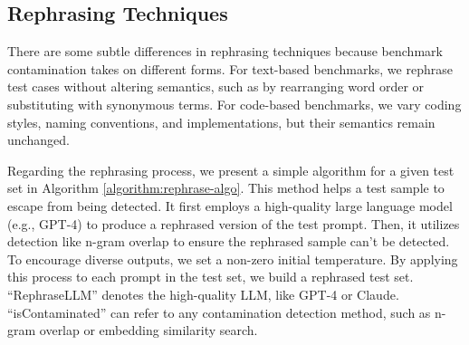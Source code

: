 

\subsection{Rephrasing Techniques} 



There are some subtle differences in rephrasing techniques because benchmark contamination takes on different forms.
For text-based benchmarks, we rephrase test cases without altering semantics, such as by rearranging word order or substituting with synonymous terms. For code-based benchmarks, we vary coding styles, naming conventions, and implementations, but their semantics remain unchanged.

Regarding the rephrasing process, we present a simple algorithm for a given test set in Algorithm \ref{algorithm:rephrase-algo}. 
This method helps a test sample to escape from being detected.
It first employs a high-quality large language model (e.g., GPT-4) to produce a rephrased version of the test prompt. Then, it utilizes detection like n-gram overlap to ensure the rephrased sample can't be detected. 
To encourage diverse outputs, we set a non-zero initial temperature. 
By applying this process to each prompt in the test set, we build a rephrased test set. 
``RephraseLLM'' denotes the high-quality LLM, like GPT-4 or Claude. 
``isContaminated'' can refer to any contamination detection method, such as n-gram overlap or embedding similarity search.

